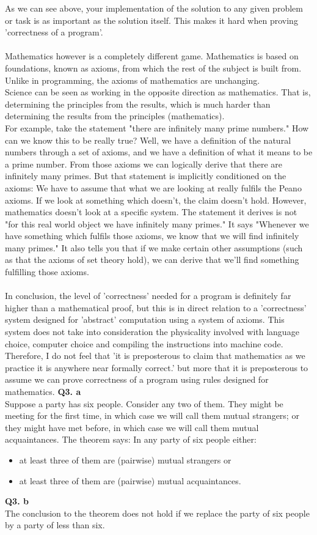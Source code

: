 \documentclass[a4paper,12pt]{article}
\begin{document}
As we can see above, your implementation of the solution to any given problem or task is as important as the solution itself. This makes it hard when proving 'correctness of a program'. \\
\\
Mathematics however is a completely different game. Mathematics is based on foundations, known as axioms, from which the rest of the subject is built from.  Unlike in programming, the axioms of mathematics are unchanging. \\
Science can be seen as working in the opposite direction as mathematics. That is, determining the principles from the results, which is much harder than determining the results from the principles (mathematics).\\
For example, take the statement "there are infinitely many prime numbers." How can we know this to be really true? Well, we have a definition of the natural numbers through a set of axioms, and we have a definition of what it means to be a prime number. From those axioms we can logically derive that there are infinitely many primes. But that statement is implicitly conditioned on the axioms: We have to assume that what we are looking at really fulfils the Peano axioms. If we look at something which doesn't, the claim doesn't hold. However, mathematics doesn't look at a specific system. The statement it derives is not "for this real world object we have infinitely many primes." It says "Whenever we have something which fulfils those axioms, we know that we will find infinitely many primes." It also tells you that if we make certain other assumptions (such as that the axioms of set theory hold), we can derive that we'll find something fulfilling those axioms.\\
\\
In conclusion, the level of 'correctness' needed for a program is definitely far higher than a mathematical proof, but this is in direct relation to a 'correctness' system designed for 'abstract' computation using a system of axioms. This system does not take into consideration the physicality involved with language choice, computer choice and compiling the instructions into machine code. Therefore, I do not feel that 'it is preposterous to claim that mathematics as we practice it is anywhere near formally correct.' but more that it is preposterous to assume we can prove correctness of a program using rules designed for mathematics.
\newpage
\noindent \textbf{Q3. a} \\
Suppose a party has six people. Consider any two of them. They might be meeting for the first time, in which case we will call them mutual strangers; or they might have met before, in which case we will call them mutual acquaintances. The theorem says:
In any party of six people either:
\begin{itemize}
\item at least three of them are (pairwise) mutual strangers or
\item at least three of them are (pairwise) mutual acquaintances.
\end{itemize}
\noindent \textbf{Q3. b} \\
The conclusion to the theorem does not hold if we replace the party of six people by a party of less than six.
\end{document}
